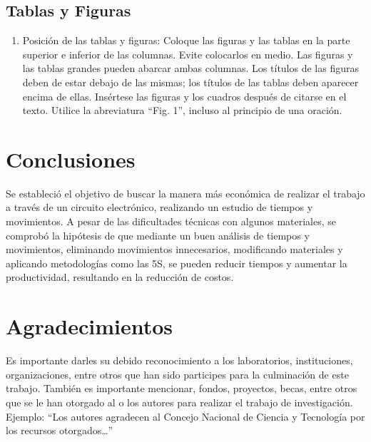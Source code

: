     \subsection{Tablas y Figuras}
    \newpage
    \label{anexo:Tiempos}
    
    \begin{enumerate}
        \item Posición de las tablas y figuras: Coloque las figuras y las tablas en la parte superior e inferior de las columnas. Evite colocarlos en medio. Las figuras y las tablas grandes pueden abarcar ambas columnas. Los títulos de las figuras deben de estar debajo de las mismas; los títulos de las tablas deben aparecer encima de ellas. Insértese las figuras y los cuadros después de citarse en el texto. Utilice la abreviatura “Fig. 1”, incluso al principio de una oración. 
    \end{enumerate}
    
    \section{Conclusiones}
    
        Se estableció el objetivo de buscar la manera más económica de realizar el trabajo a través de un circuito electrónico, realizando un estudio de tiempos y movimientos. A pesar de las dificultades técnicas con algunos materiales, se comprobó la hipótesis de que mediante un buen análisis de tiempos y movimientos, eliminando movimientos innecesarios, modificando materiales y aplicando metodologías como las 5S, se pueden reducir tiempos y aumentar la productividad, resultando en la reducción de costos.
    
    
    
    \section{Agradecimientos}
    
    Es importante darles su debido reconocimiento a los laboratorios, instituciones, organizaciones, entre otros que han sido participes para la culminación de este trabajo. También es importante mencionar, fondos, proyectos, becas, entre otros que se le han otorgado al o los autores para realizar el trabajo de investigación. Ejemplo: “Los autores agradecen al Concejo Nacional de Ciencia y Tecnología por los recursos otorgados…”
    
